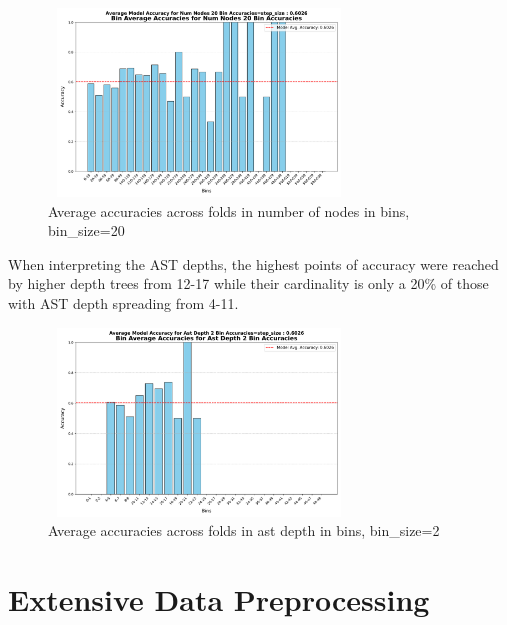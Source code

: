 \documentclass[10pt,english,a4paper]{report}
\begin{document}
\begin{figure}[H]
    \centering
    \includegraphics[width=8cm, height=5cm]{figures/testing/bins/num_nodes_20_bin_accuracies.pdf}
    \caption{Average accuracies across folds in number of nodes in bins, bin\_size=20}
    \label{fig:bins_nodes}
\end{figure}

When interpreting the AST depths, the highest points of accuracy were reached by higher depth trees from 12-17
while their cardinality is only a 20\% of those with AST depth spreading from 4-11.

\begin{figure}[H]
    \centering
    \includegraphics[width=8cm, height=5cm]{figures/testing/bins/ast_depth_2_bin_accuracies.pdf}
    \caption{Average accuracies across folds in ast depth in bins, bin\_size=2}
    \label{fig:bins_depth}
\end{figure}


\section{Extensive Data Preprocessing}





\end{document}
